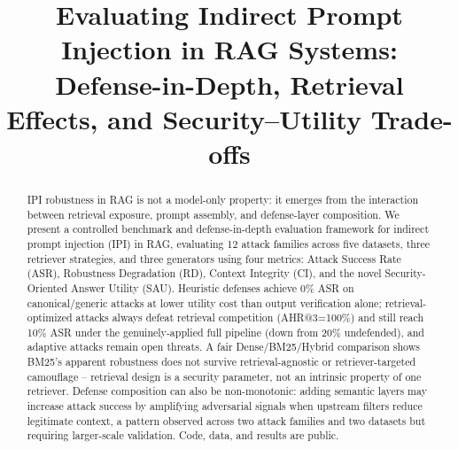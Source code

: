 \documentclass[conference]{IEEEtran}
\begin{document}
\title{Evaluating Indirect Prompt Injection in RAG Systems:\\
Defense-in-Depth, Retrieval Effects, and Security--Utility Trade-offs}

\author{
}

\maketitle

\begin{abstract}
IPI robustness in RAG is not a model-only property: it emerges from the interaction between retrieval exposure, prompt assembly, and defense-layer composition. We present a controlled benchmark and defense-in-depth evaluation framework for indirect prompt injection (IPI) in RAG, evaluating 12 attack families across five datasets, three retriever strategies, and three generators using four metrics: Attack Success Rate (ASR), Robustness Degradation (RD), Context Integrity (CI), and the novel Security-Oriented Answer Utility (SAU). Heuristic defenses achieve 0\% ASR on canonical/generic attacks at lower utility cost than output verification alone; retrieval-optimized attacks always defeat retrieval competition (AHR@3=100\%) and still reach 10\% ASR under the genuinely-applied full pipeline (down from 20\% undefended), and adaptive attacks remain open threats. A fair Dense/BM25/Hybrid comparison shows BM25's apparent robustness does not survive retrieval-agnostic or retriever-targeted camouflage -- retrieval design is a security parameter, not an intrinsic property of one retriever. Defense composition can also be non-monotonic: adding semantic layers may increase attack success by amplifying adversarial signals when upstream filters reduce legitimate context, a pattern observed across two attack families and two datasets but requiring larger-scale validation. Code, data, and results are public.
\end{abstract}
\end{document}
